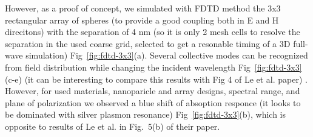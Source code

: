 \documentclass[a4paper]{article}
\begin{document}
However, as a proof of concept, we simulated with FDTD method the 3x3
rectangular array of spheres (to provide a good coupling both in E and
H direcitons) with the separation of 4 nm (so it is only 2 mesh cells
to resolve the separation in the used coarse grid, selected to get a
resonable timing of a 3D full-wave simulation)
Fig~\ref{fig:fdtd-3x3}(a). Several collective modes can be recognized
from field distribution while changing the incident wavelength
Fig~\ref{fig:fdtd-3x3}(c-e) (it can be interesting to compare this results
with Fig 4 of Le et al. paper)  . However, for used materials, nanoparicle
and array designs, spectral range, and plane of polarization we
observed a blue shift of absoption responce (it looks to be dominated
with silver plasmon resonance) Fig~\ref{fig:fdtd-3x3}(b), which is
opposite to results of Le et al. in Fig.~5(b) of their paper.
\end{document}
